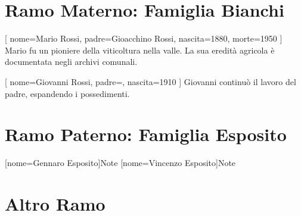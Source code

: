 \documentclass[style=default]{genealogic}
\begin{document}
\tableofcontents

\part{Ramo Materno: Famiglia Bianchi}

\Generation %

[
  nome={Mario Rossi},
  padre={Gioacchino Rossi},
  nascita={1880},
  morte={1950}
]{
  Mario fu un pioniere della viticoltura nella valle. 
  La sua eredità agricola è documentata negli archivi comunali.
}

\Generation %
[
  nome={Giovanni Rossi},
  padre={}, %
  nascita={1910}
]{
  Giovanni continuò il lavoro del padre, espandendo i possedimenti.
}

\part{Ramo Paterno: Famiglia Esposito}

\Generation %

[nome={Gennaro Esposito}]{Note}
[nome={Vincenzo Esposito}]{Note}



\Generation %
\Generation %

\part{Altro Ramo}
\Generation %


\end{document}
